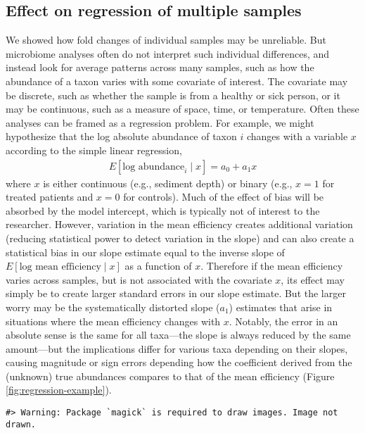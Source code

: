 \documentclass[
]{article}
\theoremstyle{definition}
\theoremstyle{definition}
\theoremstyle{definition}
\theoremstyle{definition}
\theoremstyle{remark}
\begin{document}
\hypertarget{effect-on-regression-of-multiple-samples}{%
\subsection{Effect on regression of multiple samples}\label{effect-on-regression-of-multiple-samples}}

We showed how fold changes of individual samples may be unreliable.
But microbiome analyses often do not interpret such individual differences, and instead look for average patterns across many samples, such as how the abundance of a taxon varies with some covariate of interest.
The covariate may be discrete, such as whether the sample is from a healthy or sick person, or it may be continuous, such as a measure of space, time, or temperature.
Often these analyses can be framed as a regression problem.
For example, we might hypothesize that the log absolute abundance of taxon \(i\) changes with a variable \(x\) according to the simple linear regression,
\begin{align}
  E[\text{log abundance}_{i} \mid x] = a_{0} + a_{1}x
\end{align}
where \(x\) is either continuous (e.g., sediment depth) or binary (e.g., \(x=1\) for treated patients and \(x=0\) for controls).
Much of the effect of bias will be absorbed by the model intercept, which is typically not of interest to the researcher.
However, variation in the mean efficiency creates additional variation (reducing statistical power to detect variation in the slope) and can also create a statistical bias in our slope estimate equal to the inverse slope of \(E[\text{log mean efficiency}\mid x]\) as a function of \(x\).
Therefore if the mean efficiency varies across samples, but is not associated with the covariate \(x\), its effect may simply be to create larger standard errors in our slope estimate.
But the larger worry may be the systematically distorted slope (\(a_1\)) estimates that arise in situations where the mean efficiency changes with \(x\).
Notably, the error in an absolute sense is the same for all taxa---the slope is always reduced by the same amount---but the implications differ for various taxa depending on their slopes, causing magnitude or sign errors depending how the coefficient derived from the (unknown) true abundances compares to that of the mean efficiency (Figure \ref{fig:regression-example}).

\begin{verbatim}
#> Warning: Package `magick` is required to draw images. Image not drawn.
\end{verbatim}
\end{document}
